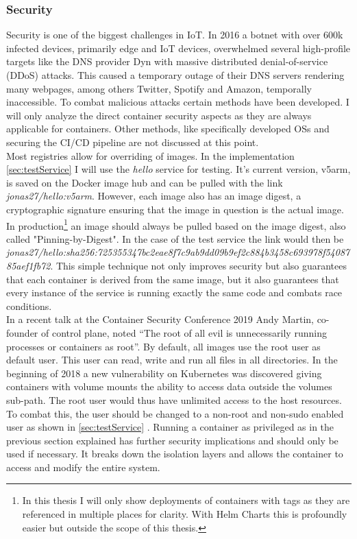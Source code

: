 \subsubsection{Security}
Security is one of the biggest challenges in IoT. In 2016 a botnet with over 600k infected devices, primarily edge and IoT devices, overwhelmed several high-profile targets like the DNS provider Dyn with massive distributed denial-of-service (DDoS) attacks. This caused a temporary outage of their DNS servers rendering many webpages, among others  Twitter, Spotify and Amazon, temporally inaccessible. To combat malicious attacks certain methods have been developed. I will only analyze the direct container security aspects as they are always applicable for containers. Other methods, like specifically developed OSs and securing the CI/CD pipeline are not discussed at this point.\\
Most registries allow for overriding of images. In the implementation \cref{sec:testService}  I will use the \textit{hello} service for testing. It's current version, v5arm, is saved on the Docker image hub and can be pulled with the link \textit{jonas27/hello:v5arm}. However, each image also has an image digest, a cryptographic signature ensuring that the image in question is the actual image. In production\footnote{In this thesis I will only show deployments of containers with tags as they are referenced in multiple places for clarity. With Helm Charts this is profoundly easier but outside the scope of this thesis.} an image should always be pulled based on the image digest, also called "Pinning-by-Digest". In the case of the test service the link would then be \textit{jonas27/hello:sha256:725355347bc2eae8f7c9ab9dd09b9ef2c884b3458c693978f5408785aef1fb72}. This simple technique not only improves security but also guarantees that each container is derived from the same image, but it also guarantees that every instance of the service is running exactly the same code and combats race conditions.\\
In a recent talk at the Container Security Conference 2019 Andy Martin, co-founder of control plane, noted ``The root of all evil is unnecessarily running processes or containers as root''\cite{RootlessContainerSecurityTalk0:online}. By default, all images use the root user as default user. This user can read, write and run all files in all directories. In the beginning of 2018 a new vulnerability on Kubernetes was discovered giving containers with volume mounts the ability to access data outside the volumes sub-path. The root user would thus have unlimited access to the host resources. To combat this, the user should be changed to a non-root and non-sudo enabled user as shown in \cref{sec:testService} . Running a container as privileged as in the previous section explained has further security implications and should only be used if necessary. It breaks down the isolation layers and allows the container to access and modify the entire system.\\
